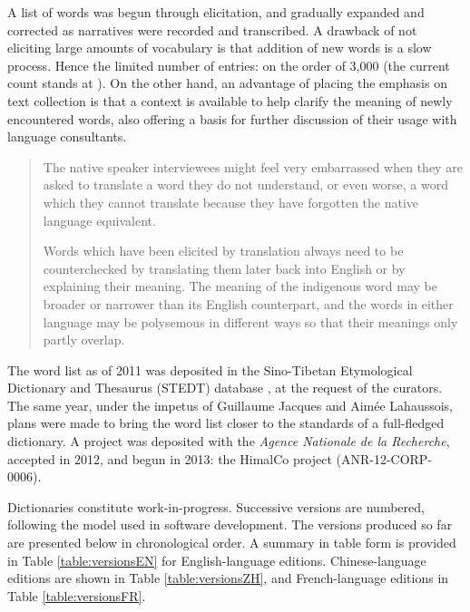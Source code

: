 
A list of words was begun through elicitation, and gradually expanded and corrected as narratives were recorded and transcribed. A drawback of not eliciting large amounts of vocabulary is that addition of new words is a slow process. Hence the limited number of entries: on the order of 3,000 (the current count stands at ). On the other hand, an advantage of placing the emphasis on text collection is that a context is available to help clarify the meaning of newly encountered words, also offering a basis for further discussion of their usage with language consultants.

\begin{quotation}
    The native speaker interviewees might feel very embarrassed when they are asked to translate a word they do not understand, or even worse, a word which they cannot translate because they have forgotten the native language equivalent.

Words which have been elicited by translation always need to be counterchecked by translating them later back into English or by explaining their meaning. The meaning of the indigenous word may be broader or narrower than its English counterpart, and the words in either language may be polysemous in different ways so that their meanings only partly overlap. \parencite[44]{mosel_dictionary_2004}
\end{quotation}

The word list as of 2011 was deposited in the Sino-Tibetan Etymological Dictionary and Thesaurus (STEDT) database \parencite{stedt}, at the request of the curators. The same year, under the impetus of Guillaume Jacques and Aimée Lahaussois, plans were made to bring the word list closer to the standards of a full-fledged dictionary. A project was deposited with the \emph{Agence Nationale de la Recherche}, accepted in 2012, and begun in 2013: the HimalCo project (ANR-12-CORP-0006).

Dictionaries constitute work-in-progress. Successive versions are numbered, following the model used in software development. %
The versions produced so far are presented below in chronological order. A summary in table form is provided in Table \ref{table:versionsEN} for English-language editions. Chinese-language editions are shown in Table \ref{table:versionsZH}, and French-language editions in Table \ref{table:versionsFR}.


